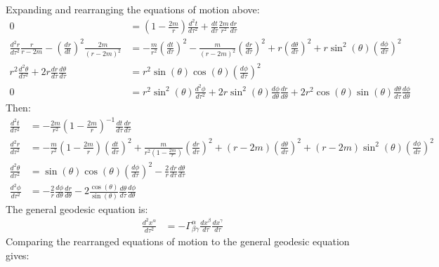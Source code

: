 \documentclass[a4paper]{article}
\begin{document}
\subsection{}
Expanding and rearranging the equations of motion above:
\begin{align*}
	0 &= \left(1-\frac{2m}{r}\right) \frac{d^2 t}{d\tau^2}  + \frac{dt}{d\tau} \frac{2m}{r^2} \frac{dr}{d\tau} \\
	\frac{d^2r}{d\tau^2} \frac{r}{r-2m} - \left(\frac{dr}{dt}\right)^2 \frac{2m}{(r-2m)^2}&=   -\frac{m}{r^2} \left(\frac{dt}{d\tau} \right)^2 - \frac{m}{(r-2m)^2}  \left(\frac{dr}{d\tau} \right)^2 + r  \left(\frac{d\theta}{d\tau} \right)^2  + r\sin^2(\theta)  \left(\frac{d\phi}{d\tau} \right)^2 \\
	r^2 \frac{d^2\theta}{d\tau^2} + 2r \frac{dr}{d\tau} \frac{d\theta}{d\tau}  &= r^2 \sin(\theta)\cos(\theta) \left( \frac{d\phi}{d\tau} \right)^2 \\
	0 &= r^2 \sin^2(\theta) \frac{d^2\phi}{d\tau^2} + 2r \sin^2(\theta) \frac{d\phi}{d\theta}\frac{dr}{d\theta} + 2r^2 \cos(\theta) \sin(\theta) \frac{d\theta}{d\tau} \frac{d\phi}{d\theta}
\end{align*}
Then:
\begin{align*}
	\frac{d^2 t}{d\tau^2} &= - \frac{2m}{r^2} \left(1-\frac{2m}{r}\right)^{-1} \frac{dt}{d\tau}  \frac{dr}{d\tau}\\
	\frac{d^2r}{d\tau^2} &=   -\frac{m}{r^2} \left(1-\frac{2m}{r}\right) \left(\frac{dt}{d\tau} \right)^2 + \frac{m}{r^2\left(1-\frac{2m}{r}\right)}  \left(\frac{dr}{d\tau} \right)^2 + (r - 2m)  \left(\frac{d\theta}{d\tau} \right)^2  + (r - 2m)\sin^2(\theta)  \left(\frac{d\phi}{d\tau} \right)^2\\
	\frac{d^2\theta}{d\tau^2}  &= \sin(\theta)\cos(\theta) \left( \frac{d\phi}{d\tau} \right)^2 - \frac{2}{r} \frac{dr}{d\tau} \frac{d\theta}{d\tau} \\
	 \frac{d^2\phi}{d\tau^2} &= - \frac{2}{r}  \frac{d\phi}{d\theta}\frac{dr}{d\theta} - 2 \frac{\cos(\theta)}{ \sin(\theta)} \frac{d\theta}{d\tau} \frac{d\phi}{d\theta}
\end{align*}
The general geodesic equation is:
\begin{align*}
\frac{d^2 x^\alpha}{d\tau^2} &= -\Gamma^\alpha_{\beta \gamma} \frac{dx^\beta}{d\tau}\frac{dx^\gamma}{d\tau}
\end{align*}
Comparing the rearranged equations of motion to the general geodesic equation gives:
\end{document}
